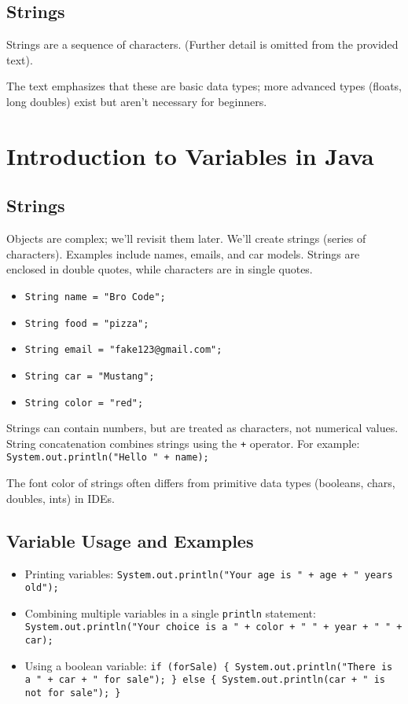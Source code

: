 \documentclass{article}
\begin{document}
\subsection{Strings}

Strings are a sequence of characters.  (Further detail is omitted from the provided text).


The text emphasizes that these are basic data types; more advanced types (floats, long doubles) exist but aren't necessary for beginners.


\section{Introduction to Variables in Java}

\subsection{Strings}
Objects are complex; we'll revisit them later.  We'll create strings (series of characters).  Examples include names, emails, and car models. Strings are enclosed in double quotes, while characters are in single quotes.

\begin{itemize}
    \item \texttt{String name = "Bro Code";}
    \item \texttt{String food = "pizza";}
    \item \texttt{String email = "fake123@gmail.com";}
    \item \texttt{String car = "Mustang";}
    \item \texttt{String color = "red";}
\end{itemize}

Strings can contain numbers, but are treated as characters, not numerical values.  String concatenation combines strings using the \texttt{+} operator.  For example: \texttt{System.out.println("Hello " + name);}

The font color of strings often differs from primitive data types (booleans, chars, doubles, ints) in IDEs.


\subsection{Variable Usage and Examples}

\begin{itemize}
    \item Printing variables:  \texttt{System.out.println("Your age is " + age + " years old");}
    \item Combining multiple variables in a single \texttt{println} statement:  \texttt{System.out.println("Your choice is a " + color + " " + year + " " + car);}
    \item Using a boolean variable:  \texttt{if (forSale) \{ System.out.println("There is a " + car + " for sale"); \} else \{ System.out.println(car + " is not for sale"); \}}
\end{itemize}
\end{document}
